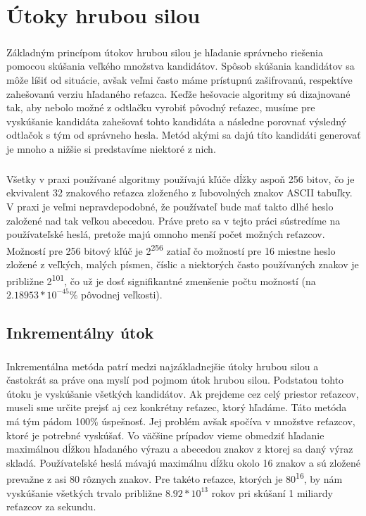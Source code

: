 \chapter{Útoky hrubou silou}
\paragraph{}
Základným princípom útokov hrubou silou je hľadanie správneho riešenia pomocou skúšania veľkého množstva kandidátov. Spôsob skúšania kandidátov sa môže líšiť od situácie, avšak veľmi často máme prístupnú zašifrovanú, respektíve zahešovanú verziu hľadaného reťazca. Keďže hešovacie algoritmy sú dizajnované tak, aby nebolo možné z odtlačku vyrobiť pôvodný reťazec, musíme pre vyskúšanie kandidáta zahešovať tohto kandidáta a následne porovnať výsledný odtlačok s tým od správneho hesla. Metód akými sa dajú títo kandidáti generovať je mnoho a nižšie si predstavíme niektoré z nich.

\paragraph{}
Všetky v praxi používané algoritmy používajú kľúče dĺžky aspoň 256 bitov, čo je ekvivalent 32 znakového reťazca zloženého z ľubovolných znakov ASCII tabuľky. V praxi je veľmi nepravdepodobné, že používateľ bude mať takto dlhé heslo založené nad tak veľkou abecedou. Práve preto sa v tejto práci sústredíme na používateľské heslá, pretože majú omnoho menší počet možných reťazcov. Možností pre 256 bitový kľúč je 2\textsuperscript{256} zatiaľ čo možností pre 16 miestne heslo zložené z veľkých, malých písmen, číslic a niektorých často používaných znakov je približne 2\textsuperscript{101}, čo už je dosť signifikantné zmenšenie počtu možností (na \(2.18953*10^{-45} \%\) pôvodnej veľkosti).

\section{Inkrementálny útok}
\paragraph{}
Inkrementálna metóda patrí medzi najzákladnejšie útoky hrubou silou a častokrát sa práve ona myslí pod pojmom útok hrubou silou. Podstatou tohto útoku je vyskúšanie všetkých kandidátov. Ak prejdeme cez celý priestor reťazcov, museli sme určite prejsť aj cez konkrétny reťazec, ktorý hľadáme. Táto metóda má tým pádom 100\% úspešnosť. Jej problém avšak spočíva v množstve reťazcov, ktoré je potrebné vyskúšať. Vo väčšine prípadov vieme obmedziť hľadanie maximálnou dĺžkou hľadaného výrazu a abecedou znakov z ktorej sa daný výraz skladá. Používateľské heslá mávajú maximálnu dĺžku okolo 16 znakov a sú zložené prevažne z asi 80 rôznych znakov. Pre takéto reťazce, ktorých je 80\textsuperscript{16}, by nám vyskúšanie všetkých trvalo približne \(8.92*10^{13}\) rokov pri skúšaní 1 miliardy reťazcov za sekundu.

